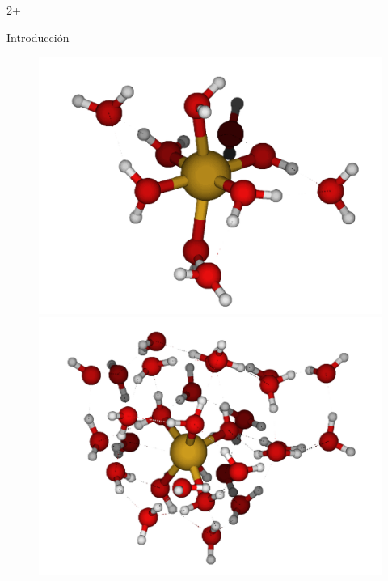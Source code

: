 \documentclass[final]{beamer}
\newlength{\sepwidth}
\newlength{\colwidth}
\begin{document}
\begin{frame}[t]
\begin{columns}[t]
\begin{column}{2\colwidth+\sepwidth}
\begin{alertblock}{Introducción}
				\begin{figure}[H]
					\centering
					\begin{minipage}[b]{0.25\textwidth}
						\centering
						\includegraphics[width=\textwidth]{logos/Cu-10H2O.png}
					\end{minipage}%
					\hfill
					\begin{minipage}[b]{0.25\textwidth}
						\centering
						\includegraphics[width=\textwidth]{logos/Cu-30H2O.png}
					\end{minipage}
					\hfill
					\begin{minipage}[b]{0.25\textwidth}
						\centering

\end{minipage}
\end{figure}
\end{alertblock}
\end{column}
\end{columns}
\end{frame}
\end{document}
